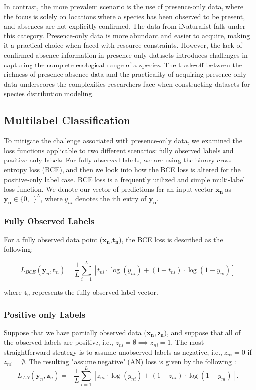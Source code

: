 \documentclass{article}
\begin{document}
In contrast, the more prevalent scenario is the use of presence-only data, where the focus is solely on locations where a species has been observed to be present, and absences are not explicitly confirmed. The data from iNaturalist falls under this category. Presence-only data is more abundant and easier to acquire, making it a practical choice when faced with resource constraints. However, the lack of confirmed absence information in presence-only datasets introduces challenges in capturing the complete ecological range of a species. The trade-off between the richness of presence-absence data and the practicality of acquiring presence-only data underscores the complexities researchers face when constructing datasets for species distribution modeling. 

\subsection{Multilabel Classification}

To mitigate the challenge associated with presence-only data, we examined the loss functions applicable to two different scenarios: fully observed labels and positive-only labels. For fully observed labels, we are using the binary cross-entropy loss (BCE), and then we look into how the BCE loss is altered for the positive-only label case. BCE loss is a frequently utilized and simple multi-label loss function. We denote our vector of predictions for an input vector $\mathbf{x_{n}}$ as $\mathbf{y_{n}} \in \{0, 1\}^L$, where $y_{ni}$ denotes the ith entry of $\mathbf{y_{n}}$.

    
\subsubsection{Fully Observed Labels}

For a fully observed data point ($\mathbf{x_{n}}$,$\mathbf{t_{n}}$), the BCE loss is described as the following:

\[
L_{BCE}(\mathbf{y}_n, \mathbf{t}_n) = \frac{1}{L} \sum_{i=1}^{L} \left[ t_{ni} \cdot \log(y_{ni}) + (1 - t_{ni}) \cdot \log(1 - y_{ni}) \right]
\]

where $\mathbf{t}_n$ represents the fully observed label vector.
\subsubsection{Positive only Labels}

Suppose that we have partially observed data $(\mathbf{x_n, z_n)}$, and suppose that all of the observed labels are positive, i.e., $z_{ni} = \emptyset \implies z_{ni} = 1$. The most straightforward strategy is to assume unobserved labels as negative, i.e., $z_{ni} = 0$ if $z_{ni} = \emptyset$. The resulting "assume negative" (AN) loss is given by the following \cite{cole2021multilabel} :
\begin{equation}
    L_{AN}(\mathbf{y}_n, \mathbf{z}_n) = -\frac{1}{L} \sum_{i=1}^{L} [z_{ni} \cdot \log(y_{ni}) + (1 - z_{ni}) \cdot \log(1 - y_{ni})].
\end{equation}
\end{document}
